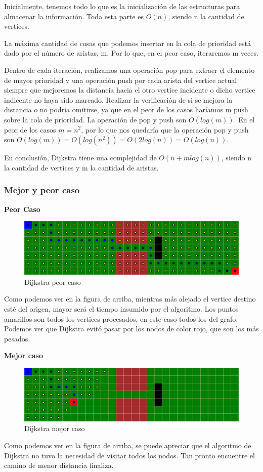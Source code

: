 Inicialmente, tenemos todo lo que es la inicialización de las estructuras para almacenar la información. Toda esta parte es $O(n)$, siendo n la cantidad de vertices.

La máxima cantidad de cosas que podemos insertar en la cola de prioridad está dado por el número de aristas, m. Por lo que, en el peor caso, iteraremos m veces.

Dentro de cada iteración, realizamos una operación pop para extraer el elemento de mayor prioridad y una operación push por cada arista del vertice actual siempre que mejoremos la distancia hacia el otro vertice incidente o dicho vertice indicente no haya sido marcado. Realizar la verificación de si se mejora la distancia o no podría omitirse, ya que en el peor de los casos haríamos m push sobre la cola de prioridad.
La operación de pop y push son $O(log(m))$. En el peor de los casos $m = n^2$, por lo que nos quedaría que la operación pop y push son $O(log(m)) = O(log(n^2)) = O(2log(n)) = O(log(n))$.

En conclusión, Dijkstra tiene una complejidad de $O(n + mlog(n))$, siendo n la cantidad de vertices y m la cantidad de aristas.

\subsubsection{Mejor y peor caso}
\textbf{Peor Caso}
\begin{figure}[H]
\centering
\includegraphics[width=\textwidth]{Dijkstra/dijkstra1Result.png}
\caption{Dijkstra peor caso}
\end{figure}

Como podemos ver en la figura de arriba, mientras más alejado el vertice destino esté del origen, mayor será el tiempo insumido por el algoritmo. Los puntos amarillos son todos los vertices procesados, en este caso todos los del grafo. Podemos ver que Dijkstra evitó pasar por los nodos de color rojo, que son los más pesados.

\textbf{Mejor caso}
\begin{figure}[H]
\centering
\includegraphics[width=\textwidth]{Dijkstra/dijkstra2Result.png}
\caption{Dijkstra mejor caso}
\end{figure}
Como podemos ver en la figura de arriba, se puede apreciar que el algoritmo de Dijkstra no tuvo la necesidad de visitar todos los nodos. Tan pronto encuentre el camino de menor distancia finaliza.

